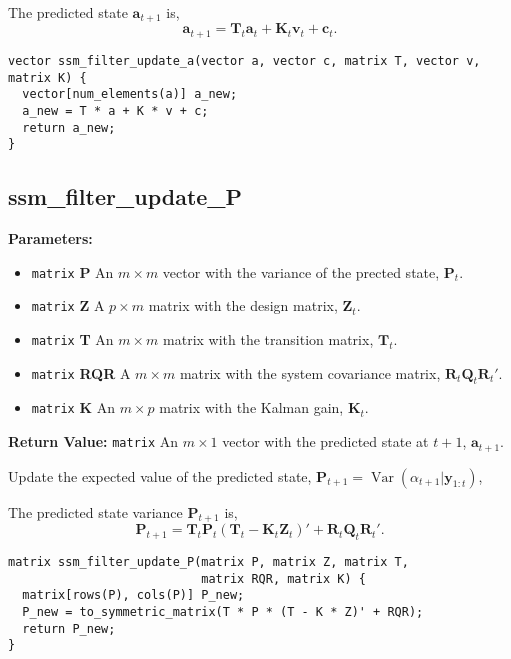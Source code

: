 \documentclass[]{book}
\providecommand{\tightlist}{%
  \setlength{\itemsep}{0pt}\setlength{\parskip}{0pt}}
\DeclareMathOperator{\Var}{Var}
\newcommand{\mat}[1]{\boldsymbol{#1}}
\renewcommand{\vec}[1]{\boldsymbol{#1}}
\begin{document}
The predicted state \(\vec{a}_{t + 1}\) is, \[
\vec{a}_{t + 1} = \mat{T}_t \vec{a}_t + \mat{K}_t \vec{v}_t + \vec{c}_t .
\]

\begin{verbatim}
vector ssm_filter_update_a(vector a, vector c, matrix T, vector v, matrix K) {
  vector[num_elements(a)] a_new;
  a_new = T * a + K * v + c;
  return a_new;
}
\end{verbatim}

\subsection{ssm\_filter\_update\_P}\label{ssmux5ffilterux5fupdateux5fp}

\textbf{Parameters:}

\begin{itemize}
\tightlist
\item
  \texttt{matrix} \textbf{P} An \(m \times m\) vector with the variance
  of the prected state, \(\mat{P}_t\).
\item
  \texttt{matrix} \textbf{Z} A \(p \times m\) matrix with the design
  matrix, \(\mat{Z}_t\).
\item
  \texttt{matrix} \textbf{T} An \(m \times m\) matrix with the
  transition matrix, \(\mat{T}_t\).
\item
  \texttt{matrix} \textbf{RQR} A \(m \times m\) matrix with the system
  covariance matrix, \(\mat{R}_t \mat{Q}_t \mat{R}_t'\).
\item
  \texttt{matrix} \textbf{K} An \(m \times p\) matrix with the Kalman
  gain, \(\mat{K}_t\).
\end{itemize}

\textbf{Return Value:} \texttt{matrix} An \(m \times 1\) vector with the
predicted state at \(t + 1\), \(\vec{a}_{t + 1}\).

Update the expected value of the predicted state,
\(\mat{P}_{t + 1} = \Var(\alpha_{t + 1} | \vec{y}_{1:t})\),

The predicted state variance \(\mat{P}_{t + 1}\) is, \[
\mat{P}_{t + 1} = \mat{T}_t \mat{P}_t (\mat{T}_t - \mat{K}_t \mat{Z}_t)' + \mat{R}_t \mat{Q}_t \mat{R}_t' .
\]

\begin{verbatim}
matrix ssm_filter_update_P(matrix P, matrix Z, matrix T,
                           matrix RQR, matrix K) {
  matrix[rows(P), cols(P)] P_new;
  P_new = to_symmetric_matrix(T * P * (T - K * Z)' + RQR);
  return P_new;
}
\end{verbatim}
\end{document}
